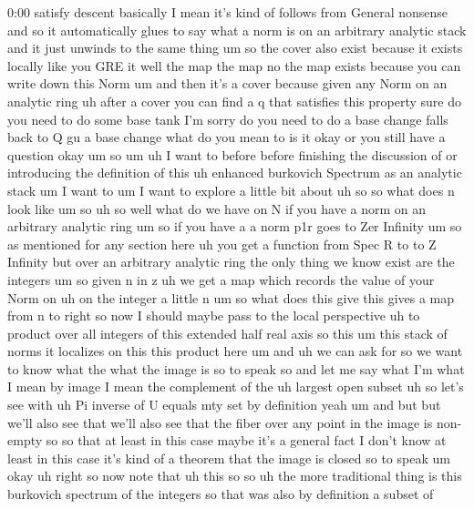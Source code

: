 \begin{unfinished}{0:00}
satisfy  descent  basically  I  mean  it's
kind  of  follows  from  General  nonsense
and  so  it  automatically  glues  to  say
what  a  norm  is  on  an  arbitrary  analytic
stack  and  it  just  unwinds  to  the  same
thing  um  so  the  cover  also  exist  because
it  exists  locally  like  you  GRE  it  well
the  map  the  map  no  the  map  exists
because  you  can  write  down  this
Norm  um  and  then  it's  a  cover  because
given  any  Norm  on  an  analytic  ring  uh
after  a  cover  you  can  find  a  q  that
satisfies  this
property  sure  do  you  need  to  do  some
base  tank  I'm  sorry  do  you  need  to  do  a
base  change  falls  back  to  Q  gu  a  base
change  what  do  you
mean
to
is  it  okay  or  you  still  have  a  question
okay
um  so
um  uh  I  want  to  before  before  finishing
the  discussion  of  or  introducing  the
definition  of  this  uh  enhanced  burkovich
Spectrum  as  an  analytic  stack  um  I  want
to
um  I  want  to  explore  a  little  bit  about
uh  so  so  what  does  n  look
like
um  so
uh
so  well  what  do  we  have  on  N  if  you  have
a  norm  on  an  arbitrary  analytic  ring  um
so  if  you  have  a  a
norm  p1r  goes  to  Zer
Infinity  um  so  as  mentioned  for  any
section  here  uh  you  get  a  function  from
Spec  R  to  to  Z  Infinity  but  over  an
arbitrary
analytic  ring  the  only  thing  we  know
exist  are  the
integers  um  so  given  n  in
z  uh  we  get  a
map  which  records  the  value  of  your  Norm
on  uh  on  the  integer  a  little
n
um  so
what  does  this  give  this  gives  a  map
from  n  to  right  so  now  I  should  maybe
pass  to  the  local  perspective  uh  to
product  over  all  integers  of  this
extended  half  real
axis  so  this  um  this  stack  of  norms  it
localizes  on  this  this  product
here  um  and
uh  we  can  ask
for  so  we  want  to  know  what  the  what  the
image  is  so  to  speak
so  and  let  me  say  what  I'm  what  I  mean
by  image  I  mean  the
complement  of  the  uh  largest  open
subset  uh
so  let's  see  with  uh  Pi  inverse  of  U
equals  mty
set
by
definition
yeah  um  and  but  but  we'll  also  see  that
we'll  also  see  that  the  fiber  over  any
point  in  the  image  is  non-empty  so  so
that  at  least  in  this  case  maybe  it's  a
general  fact  I  don't  know  at  least  in
this  case  it's  kind  of  a  theorem  that
the  image  is  closed  so  to  speak  um
okay  uh  right  so  now  note  that  uh  this
so
so  uh  the  more  traditional  thing  is  this
burkovich  spectrum  of  the  integers  so
that  was  also  by  definition  a  subset  of

\end{unfinished}
